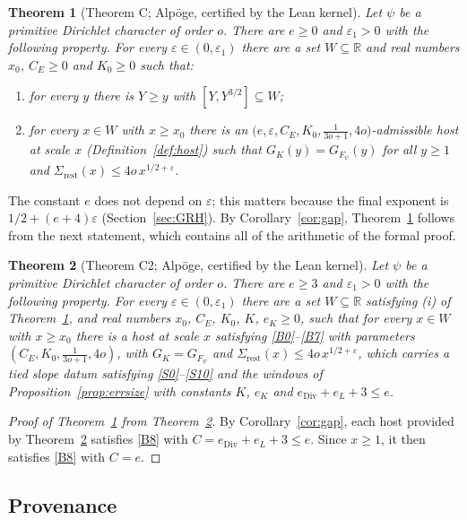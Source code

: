 \documentclass[11pt]{amsart}
\newcommand{\R}{\mathbb{R}}
\newcommand{\eps}{\varepsilon}
\theoremstyle{plain}
\newtheorem{theorem}{Theorem}[section]
\theoremstyle{definition}
\numberwithin{equation}{section}
\begin{document}
\begin{theorem}[Theorem C; Alp\"oge, certified by the Lean kernel]\label{thm:C}
Let $\psi$ be a primitive Dirichlet character of order $o$. There are $e\ge0$ and $\eps_1>0$ with
the following property. For every $\eps\in(0,\eps_1)$ there are a set $W\subseteq\R$ and real
numbers $x_0$, $C_E\ge0$ and $K_0\ge0$ such that:
\begin{enumerate}[label=(\roman*)]
\item for every $y$ there is $Y\ge y$ with $[Y,Y^{3/2}]\subseteq W$;
\item for every $x\in W$ with $x\ge x_0$ there is an
  $\bigl(e,\eps,C_E,K_0,\frac1{3o+1},4o\bigr)$-admissible host at scale $x$
  (Definition~\ref{def:host}) such that $G_K(y)=G_{F_\psi}(y)$ for all $y\ge1$ and
  $\Sigma_{\mathrm{rest}}(x)\le4o\,x^{1/2+\eps}$.
\end{enumerate}
\end{theorem}

The constant $e$ does not depend on $\eps$; this matters because the final exponent is
$1/2+(e+4)\eps$ (Section~\ref{sec:GRH}). By Corollary~\ref{cor:gap}, Theorem~\ref{thm:C} follows
from the next statement, which contains all of the arithmetic of the formal proof.

\begin{theorem}[Theorem C2; Alp\"oge, certified by the Lean kernel]\label{thm:C2}
Let $\psi$ be a primitive Dirichlet character of order $o$. There are $e\ge3$ and $\eps_1>0$ with
the following property. For every $\eps\in(0,\eps_1)$ there are a set $W\subseteq\R$ satisfying
(i) of Theorem~\ref{thm:C}, and real numbers $x_0$, $C_E$, $K_0$, $K$, $e_K\ge0$, such that for
every $x\in W$ with $x\ge x_0$ there is a host at scale $x$ satisfying \ref{B0}--\ref{B7} with
parameters $(C_E,K_0,\frac1{3o+1},4o)$, with $G_K=G_{F_\psi}$ and
$\Sigma_{\mathrm{rest}}(x)\le4o\,x^{1/2+\eps}$, which carries a tied slope datum satisfying
\ref{S0}--\ref{S10} and the windows of Proposition~\ref{prop:errsize} with constants $K$, $e_K$ and
$e_{\mathrm{Div}}+e_L+3\le e$.
\end{theorem}

\begin{proof}[Proof of Theorem~\ref{thm:C} from Theorem~\ref{thm:C2}]
By Corollary~\ref{cor:gap}, each host provided by Theorem~\ref{thm:C2} satisfies \ref{B8} with
$C=e_{\mathrm{Div}}+e_L+3\le e$. Since $x\ge1$, it then satisfies \ref{B8} with $C=e$.
\end{proof}

\subsection{Provenance}
\end{document}
